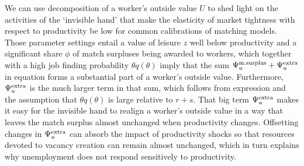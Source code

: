 We can use decomposition  of a worker's outside
value $U$
to shed light on the activities  of the
`invisible hand' that make the elasticity of market
tightness with respect to productivity be low for
common calibrations of  matching models.
Those parameter settings entail a value
of leisure $z$ well below productivity  and a
significant share $\phi$ of match surpluses being awarded to workers,
which together with  a high job finding
probability $\theta q(\theta)$ imply that the sum
$\Psi^{\rm m.surplus}_u +\Psi^{\rm extra}_u$ in equation
 forms a substantial part of a
worker's outside value. Furthermore, $\Psi^{\rm extra}_u$
is the much larger term in that sum, which follows from
expression  and the assumption that $\theta q(\theta)$
is large relative to $r+s$. That big term
$\Psi^{\rm extra}_u$ makes it easy for the
invisible hand to realign a worker's outside value in a
way that leaves the match surplus almost unchanged when
productivity changes. Offsetting changes
in $\Psi^{\rm extra}_u$ can absorb the impact of productivity
shocks so that resources devoted to vacancy creation can remain
almost unchanged, which in turn explains why unemployment
does not respond sensitively to productivity.

